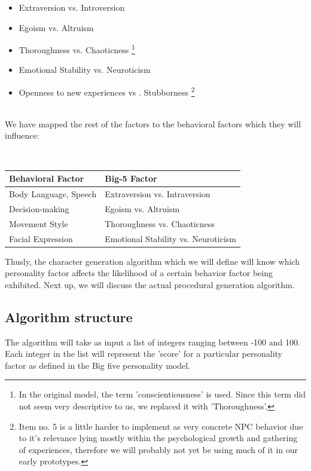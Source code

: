 \documentclass{article}
\begin{document}
   \begin{itemize}
   	\item Extraversion vs. Introversion
   	\item Egoism vs. Altruism
   	\item Thoroughness vs. Chaoticness \footnote{In the original model, the term 'conscientiousness' is used. Since this term did not seem very descriptive to us, we replaced it with 'Thoroughness'.}
   	\item Emotional Stability vs. Neuroticism 
   	\item Openness to new experiences vs . Stubborness \footnote{Item no. 5 is a little harder to implement as very concrete NPC behavior due to it's relevance lying mostly within the psychological growth and gathering of experiences, therefore we will probably not yet be using much of it in our early prototypes.}
   \end{itemize}

    ~\\
    We have mapped the rest of the factors to the behavioral factors which they will influence:

    ~\\
	\centering
	\label{my-label}
		\begin{tabular}{| p{4cm} | p{4cm} |}
		 \textbf{Behavioral Factor} & \textbf{Big-5 Factor}   \\  \hline
		 Body Language, Speech & Extraversion vs. Intraversion \\  \hline
		 Decision-making & Egoism vs. Altruism    \\  \hline
		 Movement Style & Thoroughness vs. Chaoticness    \\  \hline
 		 Facial Expression & Emotional Stability vs. Neuroticism    
		\end{tabular}
	
	Thusly, the character generation algorithm which we will define will know which personality factor affects the likelihood of a certain behavior factor being exhibited. Next up, we will discuss the actual procedural generation algorithm.

  \newpage
  \subsection{Algorithm structure}
   The algorithm will take as input a list of integers ranging between -100 and 100. Each integer in the list will represent the 'score' for a particular 
   personality factor as defined in the Big five personality model. 
\end{document}
